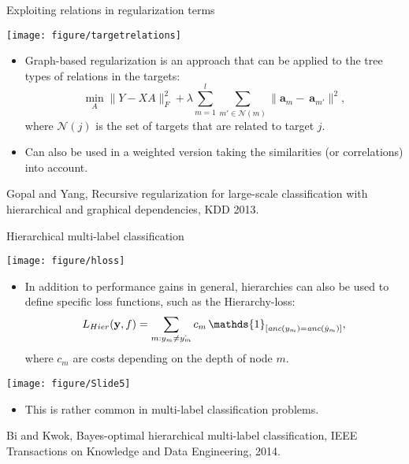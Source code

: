 \documentclass[11pt,compress,t,notes=noshow, xcolor=table]{beamer}
\newcommand{\ba}{\mathbf{a}}
\begin{document}
\begin{frame}{Exploiting relations in regularization terms}
	\footnotesize
%
	\begin{center}
		\texttt{[image: figure/targetrelations]}
	\end{center} 
%	
	\begin{itemize}
%		
		\item 	Graph-based regularization is an approach that can be applied to the tree types of relations in the targets: 
		\begin{equation*}
			\min_A \|Y - XA \|^2_F + \lambda \sum_{m=1}^l \sum_{m' \in \mathcal{N}(m)} \|\ba_m - \ \ba_{m'}\|^2,
		\end{equation*}
		where $\mathcal{N}(j)$ is the set of targets that are related to target $j.$
%		
		\item Can also be used in a weighted version taking the similarities (or correlations) into account.
%		
	\end{itemize}
	
%
	{\tiny Gopal and Yang, Recursive regularization for large-scale classification with hierarchical and graphical dependencies, KDD 2013.}
\end{frame}

\begin{frame}{Hierarchical multi-label classification}
	\small
	\vspace{-0.2cm}
	\begin{center}
		\texttt{[image: figure/hloss]}
	\end{center}
	
	\vspace{-0.2cm}
	\begin{minipage}{0.75\textwidth}   
	\begin{itemize}
%		
		\item %
		In addition to performance gains in general, hierarchies can also be used to define specific loss functions, such as the Hierarchy-loss: 
		$$L_{Hier}(\yv, f) = \sum_{m: y_m \neq \hat{y_m}} c_m \, \mathds{1}_{ [\textit{anc}(y_m) = \textit{anc}(\hat{y}_m)]  },$$
		where $c_m$ are costs depending on the depth of node $m.$
%		
	\end{itemize}
\end{minipage}
\begin{minipage}{0.2\textwidth}    
	\begin{center}
		\texttt{[image: figure/Slide5]}
	\end{center}
\end{minipage}
\begin{itemize}
%	
	\item This is rather common in multi-label classification problems.
%	
\end{itemize}

	{\tiny Bi and Kwok, Bayes-optimal hierarchical multi-label classification, IEEE Transactions on Knowledge and Data Engineering, 2014.}
%
\end{frame}
\end{document}
